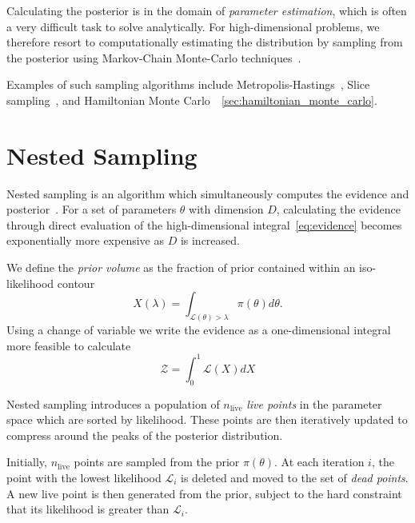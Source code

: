 \documentclass[11pt]{article}
\begin{document}
    Calculating the posterior is in the domain of \emph{parameter estimation}, which is often a very difficult task
    to solve analytically.
    For high-dimensional problems, we therefore resort to computationally estimating the distribution by sampling
    from the posterior using Markov-Chain Monte-Carlo techniques~\cite{gupta2014comparison, delmoral2013mean}.

    Examples of such sampling algorithms include Metropolis-Hastings~\cite{Metropolis_OG},
    Slice sampling~\cite{neal2003slice}, and Hamiltonian Monte Carlo~\cite{HMC_Duane, neal1996monte}~\ref{sec:hamiltonian_monte_carlo}.

    \section{Nested Sampling}\label{sec:nested_sampling}
    Nested sampling is an algorithm which simultaneously computes
    the evidence and posterior~\cite{Skilling2006, Handley_polychord, NS_Review_2022}.
    For a set of parameters $\theta$ with dimension $D$, calculating the evidence through direct evaluation of the
    high-dimensional integral~\ref{eq:evidence} becomes exponentially more expensive as $D$ is increased.

    We define the \emph{prior volume} as the fraction of prior contained within an iso-likelihood contour
    \begin{equation}\label{eq:prior_volume}
        X(\lambda) = \int_{\mathcal{L}(\theta)>\lambda} \pi(\theta) d\theta.
    \end{equation}
    Using a change of variable we write the evidence as a one-dimensional integral more feasible to calculate
    \begin{equation}\label{eq:evidence_ns}
        \mathcal{Z} = \int_0^1 {\mathcal{L}(X)} dX
    \end{equation}

    Nested sampling introduces a population of $n_{\text{live}}$ \emph{live points} in the parameter space which are sorted
    by likelihood.
    These points are then iteratively updated to compress around the peaks of the posterior distribution.

    Initially, $n_{\text{live}}$ points are sampled from the prior $\pi(\theta)$.
    At each iteration $i$, the point with the lowest likelihood $\mathcal{L}_i$ is deleted and moved to the set
    of \emph{dead points}.
    A new live point is then generated from the prior, subject to the hard constraint that its likelihood is
    greater than $\mathcal{L}_i$.
\end{document}
